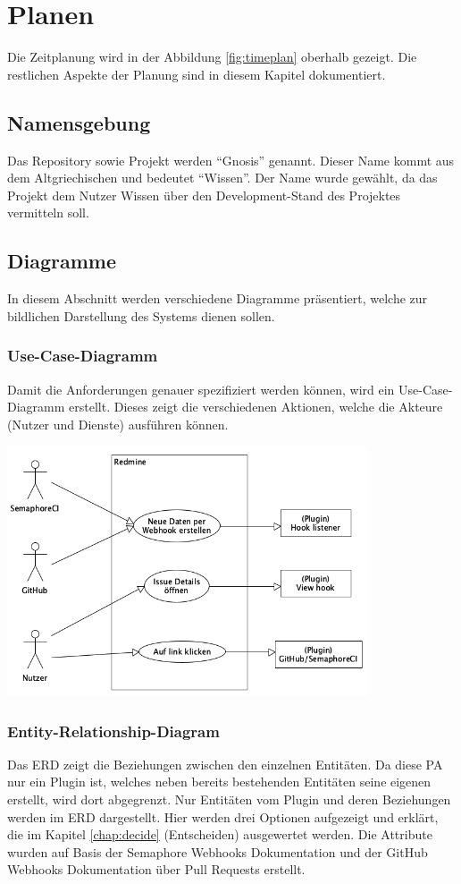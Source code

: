 \chapter{Planen}
\label{chap:plan}
Die Zeitplanung wird in der Abbildung \ref{fig:timeplan} oberhalb gezeigt. Die restlichen Aspekte der Planung sind in diesem Kapitel dokumentiert.

\section{Namensgebung}
Das Repository sowie Projekt werden \enquote{Gnosis} genannt. Dieser Name kommt aus dem Altgriechischen und bedeutet
\enquote{Wissen}. Der Name wurde gewählt, da das Projekt dem Nutzer Wissen über den Development-Stand des Projektes
vermitteln soll. 

\section{Diagramme}
In diesem Abschnitt werden verschiedene Diagramme präsentiert, welche zur bildlichen Darstellung des Systems dienen sollen.
\subsection{Use-Case-Diagramm}
Damit die Anforderungen genauer spezifiziert werden können, wird ein Use-Case-Diagramm erstellt. Dieses zeigt die verschiedenen
Aktionen, welche die Akteure (Nutzer und Dienste) ausführen können.
\begin{center}
  \includegraphics[width=0.8\textwidth]{images/use-case/base.png}
  \label{fig:use_case}
\end{center}
\subsection{Entity-Relationship-Diagram}
Das ERD zeigt die Beziehungen zwischen den einzelnen Entitäten. Da diese PA nur ein Plugin ist, welches neben
bereits bestehenden Entitäten seine eigenen erstellt, wird dort abgegrenzt. Nur Entitäten vom Plugin und
deren Beziehungen werden im ERD dargestellt. \newline
Hier werden drei Optionen aufgezeigt und erklärt, die im Kapitel \ref{chap:decide} (Entscheiden) ausgewertet werden. \newline
Die Attribute wurden auf Basis der Semaphore Webhooks Dokumentation \cite{semaphore_webhooks} und der GitHub Webhooks
Dokumentation über Pull Requests \cite{github_webhooks_pr} erstellt.

